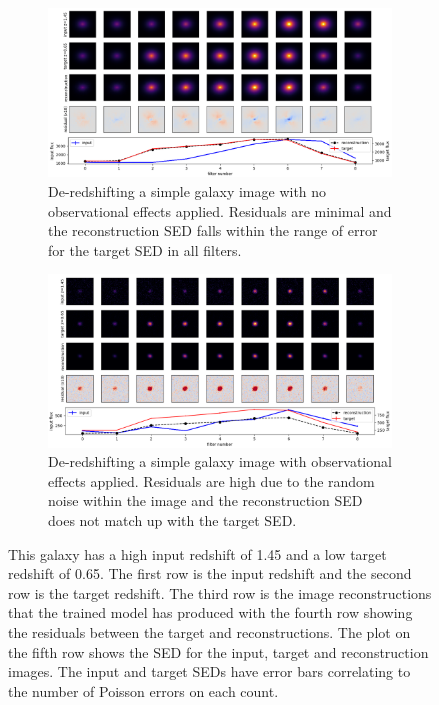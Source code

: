 \documentclass[fleqn,usenatbib]{mnras}
\begin{document}
\begin{figure}

    \begin{subfigure}[b]{2\columnwidth}
        \centering
	    \includegraphics[width=\columnwidth]{Figures/standard-high-low.png}
        \caption{De-redshifting a simple galaxy image with no observational effects applied. Residuals are minimal and the reconstruction SED falls within the range of error for the target SED in all filters.}
        \label{fig:standard-high-low}
    \end{subfigure}
    
    \begin{subfigure}[b]{2\columnwidth}
        \centering
	    \includegraphics[width=\columnwidth]{Figures/noisy-high-low.png}
        \caption{De-redshifting a simple galaxy image with observational effects applied. Residuals are high due to the random noise within the image and the reconstruction SED does not match up with the target SED.}
        \label{fig:noisy-high-low}
    \end{subfigure}
    
    \caption{This galaxy has a high input redshift of 1.45 and a low target redshift of 0.65. The first row is the input redshift and the second row is the target redshift. The third row is the image reconstructions that the trained model has produced with the fourth row showing the residuals between the target and reconstructions. The plot on the fifth row shows the SED for the input, target and reconstruction images. The input and target SEDs have error bars correlating to the number of Poisson errors on each count.}
    \label{fig:simple galaxy results plots de-redshifting}

\end{figure}
\end{document}
